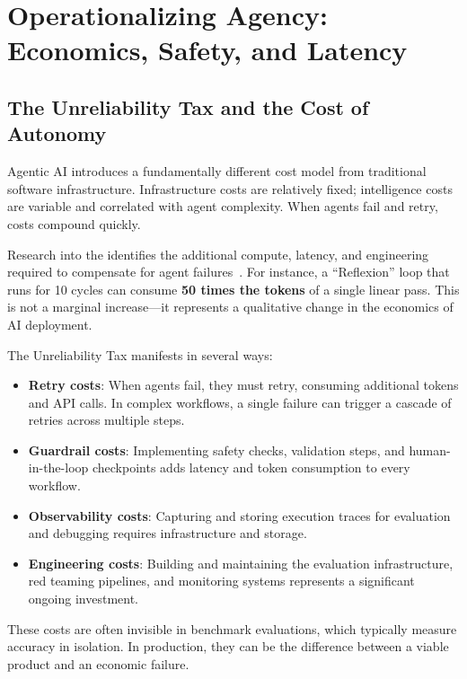 \section{Operationalizing Agency: Economics, Safety, and Latency}
\label{sec:operational}

\subsection{The Unreliability Tax and the Cost of Autonomy}

Agentic AI introduces a fundamentally different cost model from traditional software infrastructure. Infrastructure costs are relatively fixed; intelligence costs are variable and correlated with agent complexity. When agents fail and retry, costs compound quickly.

Research into the  identifies the additional compute, latency, and engineering required to compensate for agent failures~\citep{measurement_imbalance}. For instance, a ``Reflexion'' loop that runs for 10 cycles can consume \textbf{50 times the tokens} of a single linear pass. This is not a marginal increase---it represents a qualitative change in the economics of AI deployment.

The Unreliability Tax manifests in several ways:

\begin{itemize}
    \item \textbf{Retry costs}: When agents fail, they must retry, consuming additional tokens and API calls. In complex workflows, a single failure can trigger a cascade of retries across multiple steps.
    \item \textbf{Guardrail costs}: Implementing safety checks, validation steps, and human-in-the-loop checkpoints adds latency and token consumption to every workflow.
    \item \textbf{Observability costs}: Capturing and storing execution traces for evaluation and debugging requires infrastructure and storage.
    \item \textbf{Engineering costs}: Building and maintaining the evaluation infrastructure, red teaming pipelines, and monitoring systems represents a significant ongoing investment.
\end{itemize}

These costs are often invisible in benchmark evaluations, which typically measure accuracy in isolation. In production, they can be the difference between a viable product and an economic failure.

